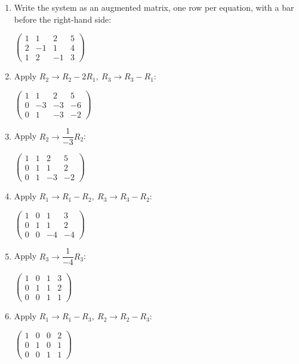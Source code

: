 \documentclass[11pt]{article}
\begin{document}
\begin{tcolorbox}[breakable,colback=ans,colframe=ansb,boxrule=0.5pt,left=4pt,right=4pt,top=2pt,bottom=2pt]\begin{enumerate}[leftmargin=2.2em,itemsep=1pt,topsep=1pt,label=\textbf{Step \arabic*.}]\item Write the system as an augmented matrix, one row per equation, with a bar before the right-hand side:\par\smallskip $\displaystyle \left(\begin{array}{ccc|c}1 & 1 & 2 & 5 \\ 2 & -1 & 1 & 4 \\ 1 & 2 & -1 & 3\end{array}\right)$
\item Apply $R_2\to R_2-2R_1,\ R_3\to R_3-R_1$:\par\smallskip $\displaystyle \left(\begin{array}{ccc|c}1 & 1 & 2 & 5 \\ 0 & -3 & -3 & -6 \\ 0 & 1 & -3 & -2\end{array}\right)$
\item Apply $R_2\to \dfrac{1}{-3} R_2$:\par\smallskip $\displaystyle \left(\begin{array}{ccc|c}1 & 1 & 2 & 5 \\ 0 & 1 & 1 & 2 \\ 0 & 1 & -3 & -2\end{array}\right)$
\item Apply $R_1\to R_1-R_2,\ R_3\to R_3-R_2$:\par\smallskip $\displaystyle \left(\begin{array}{ccc|c}1 & 0 & 1 & 3 \\ 0 & 1 & 1 & 2 \\ 0 & 0 & -4 & -4\end{array}\right)$
\item Apply $R_3\to \dfrac{1}{-4} R_3$:\par\smallskip $\displaystyle \left(\begin{array}{ccc|c}1 & 0 & 1 & 3 \\ 0 & 1 & 1 & 2 \\ 0 & 0 & 1 & 1\end{array}\right)$
\item Apply $R_1\to R_1-R_3,\ R_2\to R_2-R_3$:\par\smallskip $\displaystyle \left(\begin{array}{ccc|c}1 & 0 & 0 & 2 \\ 0 & 1 & 0 & 1 \\ 0 & 0 & 1 & 1\end{array}\right)$

\end{enumerate}
\end{tcolorbox}
\end{document}
